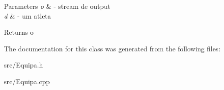 \begin{DoxyParams}{Parameters}
{\em o} & -\/ stream de output \\
\hline
{\em d} & -\/ um atleta \\
\hline
\end{DoxyParams}
\begin{DoxyReturn}{Returns}
o 
\end{DoxyReturn}


The documentation for this class was generated from the following files\+:\begin{DoxyCompactItemize}
\item 
src/Equipa.\+h\item 
src/Equipa.\+cpp\end{DoxyCompactItemize}
